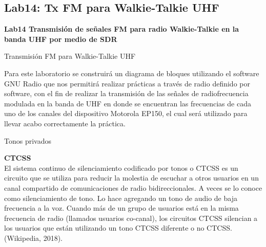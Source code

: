 \subsection{Lab14: Tx FM para Walkie-Talkie UHF}

\begin{frame}{}


\bfseries{\textrm{\LARGE Lab14 \newline \Large Transmisión de señales FM \newline para radio Walkie-Talkie en la \newline banda UHF por medio de SDR
}}
\raggedright
\end{frame}


\begin{frame}{Transmisión FM para Walkie-Talkie UHF}


Para este laboratorio se construirá un diagrama de bloques utilizando el software GNU Radio que nos permitirá realizar prácticas a través de radio definido por software, con el fin de realizar la transmisión de las señales de radiofrecuencia modulada en la banda de UHF en donde se encuentran las frecuencias de cada uno de los canales del dispositivo Motorola EP150, el cual será utilizado para llevar acabo correctamente la práctica.
\end{frame}

\begin{frame}{Tonos privados}

\textbf{CTCSS}\\
\vspace{3mm}
El sistema continuo de silenciamiento codificado por tonos o CTCSS es un circuito que se utiliza para reducir la molestia de escuchar a otros usuarios en un canal compartido de comunicaciones de radio bidireccionales. A veces se lo conoce como silenciamiento de tono. Lo hace agregando un tono de audio de baja frecuencia a la voz. Cuando más de un grupo de usuarios está en la misma frecuencia de radio (llamados usuarios co-canal), los circuitos CTCSS silencian a los usuarios que están utilizando un tono CTCSS diferente o no CTCSS. (Wikipedia, 2018).
\end{frame}

